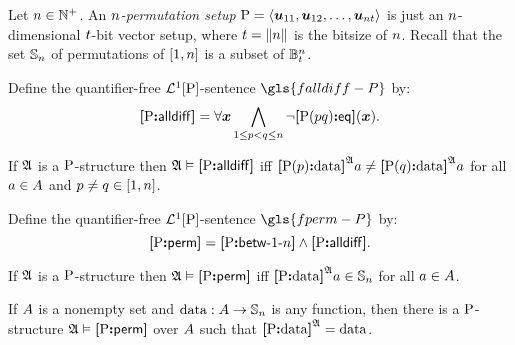 Let $\nn \in \pNats$. An \emph{$\nn$-permutation setup} 
$\PS = \seq{\suu{11}, \suu{12}, \dots, \suu{\nn\tbit}}$ is just an
$\nn$-dimensional $\tbit$-bit vector setup, where $\tbit = \bsz{\nn}$ is the
bitsize of $\nn$.
Recall that the set $\Perms\nn$ of permutations of $[1, \nn]$ is a subset of
$\ntBitnums\nn\tbit$.

\begin{definition}
Define the quantifier-free $\vFoF1\PS$-sentence $\gls{falldiff-P}$ by:
\[
  \falldiff\PS = \forall\xx \bigwedge_{1 \leq \posp < \posq \leq \nn}
  \lnot\feqP\PS\posp\posq(\xx).
\]
\end{definition}
If $\StrA$ is a $\PS$-structure then $\StrA \vDash \falldiff\PS$ iff
$\data{\PSp\posp}\StrA\ea \neq \data{\PSp\posq}\StrA\ea$
for all $\ea \in \domA$ and $\posp \neq \posq \in [1, \nn]$.

\begin{definition}
Define the quantifier-free $\vFoF1\PS$-sentence $\gls{fperm-P}$ by:
\[
  \fperm\PS = \fbetw\PS1\nn \land \falldiff\PS.
\]
\end{definition}
If $\StrA$ is a $\PS$-structure then $\StrA \vDash \fperm\PS$ iff
$\data\PS\StrA\ea \in \Perms\nn$ for all $\ea \in \domA$.

If $\domA$ is a nonempty set and $\dataOP : \domA \to \Perms\nn$ is any
function, then there is a $\PS$-structure $\StrA \vDash \fperm\PS$ over $\domA$
such that $\data\PS\StrA = \dataOP$.